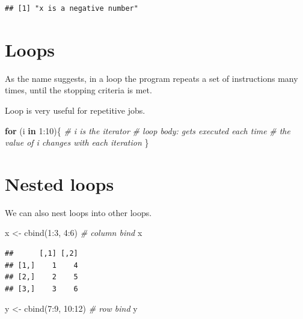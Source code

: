 \documentclass[
  11pt,
]{book}
\newenvironment{Shaded}{\begin{snugshade}}{\end{snugshade}}
\newcommand{\CommentTok}[1]{\textcolor[rgb]{0.56,0.35,0.01}{\textit{#1}}}
\newcommand{\ControlFlowTok}[1]{\textcolor[rgb]{0.13,0.29,0.53}{\textbf{#1}}}
\newcommand{\DecValTok}[1]{\textcolor[rgb]{0.00,0.00,0.81}{#1}}
\newcommand{\FunctionTok}[1]{\textcolor[rgb]{0.00,0.00,0.00}{#1}}
\newcommand{\NormalTok}[1]{#1}
\newcommand{\OtherTok}[1]{\textcolor[rgb]{0.56,0.35,0.01}{#1}}
\newcommand{\SpecialCharTok}[1]{\textcolor[rgb]{0.00,0.00,0.00}{#1}}
\begin{document}
\begin{verbatim}
## [1] "x is a negative number"
\end{verbatim}

\hypertarget{loops}{%
\section{Loops}\label{loops}}

As the name suggests, in a loop the program repeats a set of instructions many times, until the stopping criteria is met.

Loop is very useful for repetitive jobs.

\begin{Shaded}
\begin{Highlighting}[]
\ControlFlowTok{for}\NormalTok{ (i }\ControlFlowTok{in} \DecValTok{1}\SpecialCharTok{:}\DecValTok{10}\NormalTok{)\{ }\CommentTok{\# i is the iterator}
  \CommentTok{\# loop body: gets executed each time}
  \CommentTok{\# the value of i changes with each iteration}
\NormalTok{\}}
\end{Highlighting}
\end{Shaded}

\hypertarget{nested-loops}{%
\section{Nested loops}\label{nested-loops}}

We can also nest loops into other loops.

\begin{Shaded}
\begin{Highlighting}[]
\NormalTok{x }\OtherTok{\textless{}{-}} \FunctionTok{cbind}\NormalTok{(}\DecValTok{1}\SpecialCharTok{:}\DecValTok{3}\NormalTok{, }\DecValTok{4}\SpecialCharTok{:}\DecValTok{6}\NormalTok{) }\CommentTok{\# column bind}
\NormalTok{x}
\end{Highlighting}
\end{Shaded}

\begin{verbatim}
##      [,1] [,2]
## [1,]    1    4
## [2,]    2    5
## [3,]    3    6
\end{verbatim}

\begin{Shaded}
\begin{Highlighting}[]
\NormalTok{y }\OtherTok{\textless{}{-}} \FunctionTok{cbind}\NormalTok{(}\DecValTok{7}\SpecialCharTok{:}\DecValTok{9}\NormalTok{, }\DecValTok{10}\SpecialCharTok{:}\DecValTok{12}\NormalTok{) }\CommentTok{\# row bind}
\NormalTok{y}
\end{Highlighting}
\end{Shaded}
\end{document}

